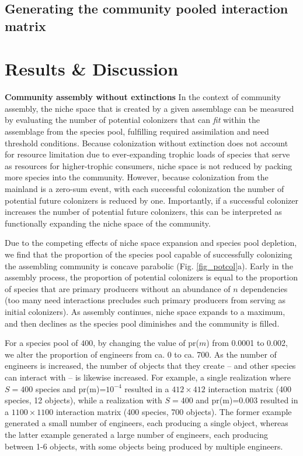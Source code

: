 \documentclass[twocolumn,preprintnumbers,amsmath,amssymb,superscriptaddress]{revtex4}
\begin{document}
\subsection{Generating the community pooled interaction matrix}

\section*{Results \& Discussion}




{\bf Community assembly without extinctions}
In the context of community assembly, the niche space that is created by a given assemblage can be measured by evaluating the number of potential colonizers that can \emph{fit} within the assemblage from the species pool, fulfilling required assimilation and need threshold conditions.
Because colonization without extinction does not account for resource limitation due to ever-expanding trophic loads of species that serve as resources for higher-trophic consumers, niche space is not reduced by packing more species into the community.
However, because colonization from the mainland is a zero-sum event, with each successful colonization the number of potential future colonizers is reduced by one.
Importantly, if a successful colonizer increases the number of potential future colonizers, this can be interpreted as functionally expanding the niche space of the community.




Due to the competing effects of niche space expansion and species pool depletion, we find that the proportion of the species pool capable of successfully colonizing the assembling community is concave parabolic (Fig. \ref{fig_potcol}a).
Early in the assembly process, the proportion of potential colonizers is equal to the proportion of species that are primary producers without an abundance of $n$ dependencies (too many need interactions precludes such primary producers from serving as initial colonizers).
As assembly continues, niche space expands to a maximum, and then declines as the species pool diminishes and the community is filled.


For a species pool of $400$, by changing the value of pr($m$) from 0.0001 to 0.002, we alter the proportion of engineers from ca. 0 to ca. 700.
As the number of engineers is increased, the number of objects that they create -- and other species can interact with -- is likewise increased.
For example, a single realization where $S=400$ species and pr(m)=$10^{-4}$ resulted in a $412\times412$ interaction matrix (400 species, 12 objects), while a realization with $S=400$ and pr(m)=$0.003$ resulted in a $1100\times1100$ interaction matrix (400 species, 700 objects).
The former example generated a small number of engineers, each producing a single object, whereas the latter example generated a large number of engineers, each producing between 1-6 objects, with some objects being produced by multiple engineers.
\end{document}
